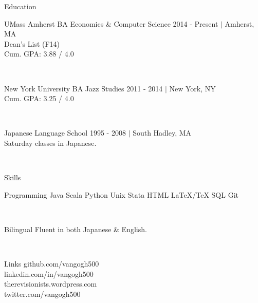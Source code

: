 \documentclass {vangogh500-resume}
\begin{document}
\begin {minipage} [t] {0.33\textwidth}
	\begin {newcategory} {Education}
		\begin{school} {UMass Amherst} {BA Economics \& Computer Science}
			2014 - Present $|$ Amherst, MA \\
			Dean's List (F14) \\
			Cum. GPA: 3.88 / 4.0 
		\end{school}
		\\[15pt]
		\begin{school} {New York University} {BA Jazz Studies}
			2011 - 2014 $|$ New York, NY \\
			Cum. GPA: 3.25 / 4.0
		\end{school}
		\\[15pt]
		\begin {newsubcategory} {Japanese Language School}
			1995 - 2008 $|$ South Hadley, MA \\
			Saturday classes in Japanese.
		\end {newsubcategory}
	\end {newcategory}
	\\[15pt]
	\begin {newcategory} {Skills}
		\begin {newsubcategory} {Programming}
			Java \textbullet{} Scala \textbullet{} Python \textbullet{} Unix \textbullet{} Stata \textbullet{} HTML
			\textbullet{} LaTeX/TeX \textbullet{} SQL \textbullet{} Git 
		\end {newsubcategory}
		\\[15pt]
		\begin {newsubcategory} {Bilingual}
			Fluent in both Japanese \& English.
		\end {newsubcategory}
	\end {newcategory}
	\\[15pt]
	\begin {newcategory} {Links}
		 {github.com/vangogh500} 
		\\[3pt]
		 {linkedin.com/in/vangogh500}
		\\[3pt]
		 {therevisionists.wordpress.com}
		\\[3pt]
		 {twitter.com/vangogh500}
	\end {newcategory}
	\\[15pt]
\end {minipage}%
\end{document}
